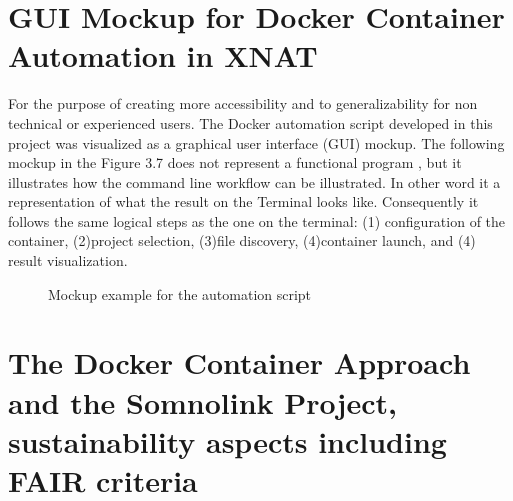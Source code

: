 \section{GUI Mockup for Docker Container Automation in XNAT}

For the purpose of creating more accessibility and to generalizability for non technical or experienced users. The Docker automation script developed in this project was visualized as a graphical user interface (GUI) mockup.
The following mockup in the Figure 3.7 does not represent a functional program , but it illustrates how the command line workflow can be illustrated. In other word it a representation of what the result on the Terminal looks like. Consequently it follows the same logical steps as the one on the terminal: (1) configuration of the container, (2)project selection, (3)file discovery,  (4)container launch, and (4) result visualization.


\begin{figure}[H]
    \centering
    \def\svgwidth{\linewidth} 
    
    \caption{Mockup example for the automation script}
    \label{fig:workflowxnat}
\end{figure}


\section{The Docker Container Approach and the Somnolink Project, sustainability aspects including FAIR criteria}

